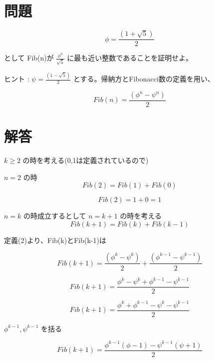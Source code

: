 \documentclass[10pt]{jarticle}
\begin{document}
\section{問題}

\begin{equation}
	\phi = \frac{(1 + \sqrt{5})}{2}
\end{equation}

として Fib(n)が $\frac{\phi^n}{\sqrt{5}}$ に最も近い整数であることを証明せよ。

ヒント : $\psi = \frac{(1-\sqrt{5})}{2}$ とする。帰納方とFibonacci数の定義を用い、

\begin{equation}
	Fib(n) = \frac{(\phi^n - \psi^n)}{2}
\end{equation}

\section{解答}

$ k \geq 2 $ の時を考える(0,1は定義されているので)

$n = 2$ の時
\begin{displaymath}
	Fib(2) = Fib(1) + Fib(0)
\end{displaymath}

\begin{displaymath}
	Fib(2) = 1 + 0 = 1
\end{displaymath}

$ n = k $ の時成立するとして $ n = k + 1$ の時を考える
\begin{equation}
	Fib(k+1) = Fib(k) + Fib(k-1)
\end{equation}

定義(2)より、Fib(k)とFib(k-1)は

\begin{equation}
	Fib(k+1) =  \frac{(\phi^k - \psi^k)}{2} +  \frac{(\phi^{k-1} - \psi^{k-1})}{2}
\end{equation}

\begin{displaymath}
	Fib(k+1) =  \frac{\phi^k - \psi^k + \phi^{k-1} - \psi^{k-1}}{2}
\end{displaymath}

\begin{displaymath}
	Fib(k+1) =  \frac{\phi^k + \phi^{k-1} - \psi^k  - \psi^{k-1}}{2}
\end{displaymath}

$\phi^{k-1} , \psi^{k-1}$ を括る

\begin{equation}
	Fib(k+1) =  \frac{\phi^{k-1}(\phi - 1) - \psi^{k-1}(\psi + 1)}{2}
\end{equation}
\end{document}

